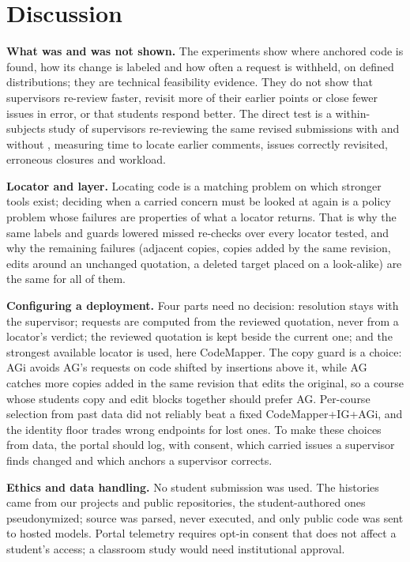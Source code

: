 \section{Discussion}\label{sec:discussion}
\textbf{What was and was not shown.} The experiments show where anchored code is found, how its change is labeled and how often a request is withheld, on defined distributions; they are technical feasibility evidence. They do not show that supervisors re-review faster, revisit more of their earlier points or close fewer issues in error, or that students respond better. The direct test is a within-subjects study of supervisors re-reviewing the same revised submissions with and without \sys{}, measuring time to locate earlier comments, issues correctly revisited, erroneous closures and workload.

\textbf{Locator and layer.} Locating code is a matching problem on which stronger tools exist; deciding when a carried concern must be looked at again is a policy problem whose failures are properties of what a locator returns. That is why the same labels and guards lowered missed re-checks over every locator tested, and why the remaining failures (adjacent copies, copies added by the same revision, edits around an unchanged quotation, a deleted target placed on a look-alike) are the same for all of them.

\textbf{Configuring a deployment.} Four parts need no decision: resolution stays with the supervisor; requests are computed from the reviewed quotation, never from a locator's verdict; the reviewed quotation is kept beside the current one; and the strongest available locator is used, here CodeMapper. The copy guard is a choice: AGi avoids AG's requests on code shifted by insertions above it, while AG catches more copies added in the same revision that edits the original, so a course whose students copy and edit blocks together should prefer AG. Per-course selection from past data did not reliably beat a fixed CodeMapper+IG+AGi, and the identity floor trades wrong endpoints for lost ones. To make these choices from data, the portal should log, with consent, which carried issues a supervisor finds changed and which anchors a supervisor corrects.

\textbf{Ethics and data handling.} No student submission was used. The histories came from our projects and public repositories, the student-authored ones pseudonymized; source was parsed, never executed, and only public code was sent to hosted models. Portal telemetry requires opt-in consent that does not affect a student's access; a classroom study would need institutional approval.


